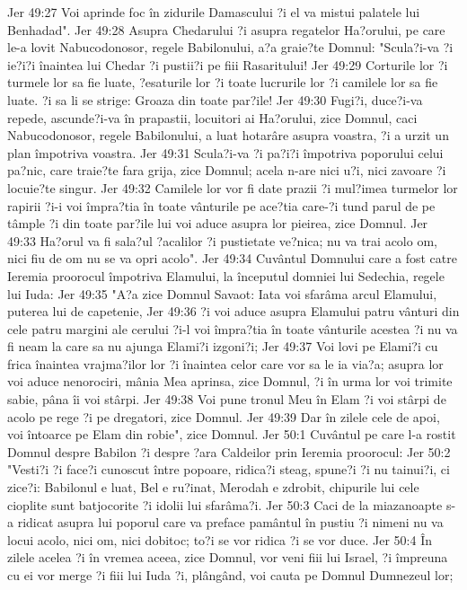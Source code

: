 Jer 49:27  Voi aprinde foc în zidurile Damascului ?i el va mistui palatele lui Benhadad".
Jer 49:28  Asupra Chedarului ?i asupra regatelor Ha?orului, pe care le-a lovit Nabucodonosor, regele Babilonului, a?a graie?te Domnul: "Scula?i-va ?i ie?i?i înaintea lui Chedar ?i pustii?i pe fiii Rasaritului!
Jer 49:29  Corturile lor ?i turmele lor sa fie luate, ?esaturile lor ?i toate lucrurile lor ?i camilele lor sa fie luate. ?i sa li se strige: Groaza din toate par?ile!
Jer 49:30  Fugi?i, duce?i-va repede, ascunde?i-va în prapastii, locuitori ai Ha?orului, zice Domnul, caci Nabucodonosor, regele Babilonului, a luat hotarâre asupra voastra, ?i a urzit un plan împotriva voastra.
Jer 49:31  Scula?i-va ?i pa?i?i împotriva poporului celui pa?nic, care traie?te fara grija, zice Domnul; acela n-are nici u?i, nici zavoare ?i locuie?te singur.
Jer 49:32  Camilele lor vor fi date prazii ?i mul?imea turmelor lor rapirii ?i-i voi împra?tia în toate vânturile pe ace?tia care-?i tund parul de pe tâmple ?i din toate par?ile lui voi aduce asupra lor pieirea, zice Domnul.
Jer 49:33  Ha?orul va fi sala?ul ?acalilor ?i pustietate ve?nica; nu va trai acolo om, nici fiu de om nu se va opri acolo".
Jer 49:34  Cuvântul Domnului care a fost catre Ieremia proorocul împotriva Elamului, la începutul domniei lui Sedechia, regele lui Iuda:
Jer 49:35  "A?a zice Domnul Savaot: Iata voi sfarâma arcul Elamului, puterea lui de capetenie,
Jer 49:36  ?i voi aduce asupra Elamului patru vânturi din cele patru margini ale cerului ?i-l voi împra?tia în toate vânturile acestea ?i nu va fi neam la care sa nu ajunga Elami?i izgoni?i;
Jer 49:37  Voi lovi pe Elami?i cu frica înaintea vrajma?ilor lor ?i înaintea celor care vor sa le ia via?a; asupra lor voi aduce nenorociri, mânia Mea aprinsa, zice Domnul, ?i în urma lor voi trimite sabie, pâna îi voi stârpi.
Jer 49:38  Voi pune tronul Meu în Elam ?i voi stârpi de acolo pe rege ?i pe dregatori, zice Domnul.
Jer 49:39  Dar în zilele cele de apoi, voi întoarce pe Elam din robie", zice Domnul.
Jer 50:1  Cuvântul pe care l-a rostit Domnul despre Babilon ?i despre ?ara Caldeilor prin Ieremia proorocul:
Jer 50:2  "Vesti?i ?i face?i cunoscut între popoare, ridica?i steag, spune?i ?i nu tainui?i, ci zice?i: Babilonul e luat, Bel e ru?inat, Merodah e zdrobit, chipurile lui cele cioplite sunt batjocorite ?i idolii lui sfarâma?i.
Jer 50:3  Caci de la miazanoapte s-a ridicat asupra lui poporul care va preface pamântul în pustiu ?i nimeni nu va locui acolo, nici om, nici dobitoc; to?i se vor ridica ?i se vor duce.
Jer 50:4  În zilele acelea ?i în vremea aceea, zice Domnul, vor veni fiii lui Israel, ?i împreuna cu ei vor merge ?i fiii lui Iuda ?i, plângând, voi cauta pe Domnul Dumnezeul lor;
